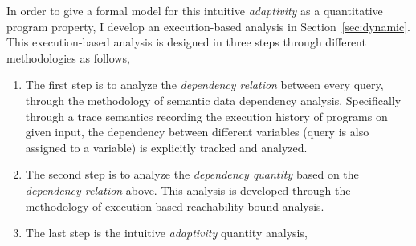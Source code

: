 \begin{enumerate}
In order to give a formal model for this intuitive \emph{adaptivity} as a quantitative program property, 
I develop an execution-based analysis in Section~\ref{sec:dynamic}.
 This execution-based analysis is designed in three steps through different methodologies as follows,
 \begin{enumerate}
 \item The first step is to analyze the \emph{dependency relation} between every query, 
 through the methodology of semantic data dependency analysis.
 Specifically through a trace semantics recording the execution history of programs on given input,
 the dependency between different variables (query is also assigned to a variable) is explicitly tracked and 
 analyzed.
 \item The second step is to analyze the \emph{dependency quantity} 
based on the \emph{dependency relation} above.
This analysis is developed through the methodology of execution-based reachability bound analysis.
 \item The last step is the intuitive \emph{adaptivity} quantity analysis, 

\end{enumerate}
\end{enumerate}
